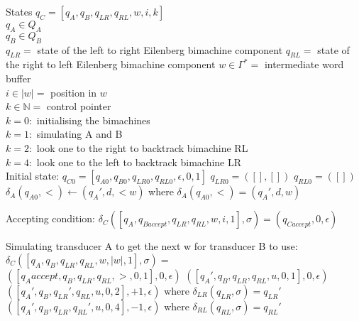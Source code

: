 \documentclass[12pt, a4paper]{article}
\begin{document}
\begin{algorithmic}
    \STATE States $q_C = [q_A, q_B, q_{LR}, q_{RL}, w, i, k]$\\
    \STATE $q_A \in Q_A$\\
    \STATE $q_B \in Q_B$\\
    \STATE $q_{LR} = $ state of the left to right Eilenberg bimachine component
    \STATE $q_{RL} = $ state of the right to left Eilenberg bimachine component
    \STATE $w \in \Gamma^* = $ intermediate word buffer\\
    \STATE $i \in |w| = $ position in $w$\\
    \STATE $k \in \mathbb{N} = $ control pointer\\
    \STATE $k = 0 : $ initialising the bimachines\\
    \STATE $k = 1 : $ simulating A and B\\
    \STATE $k = 2 : $ look one to the right to backtrack bimachine RL\\
    \STATE $k = 4 : $ look one to the left to backtrack bimachine LR\\


    \STATE Initial state: $q_{C0} = [q_{A0}, q_{B0}, q_{LR0}, q_{RL0}, \epsilon, 0, 1]$
    \STATE $q_{LR0} = ([], [])$
    \STATE $q_{RL0} = ([])$
    \STATE $\delta_A(q_{A0}, <) \gets (q_A', d, <w)$ where $\delta_A(q_{A0}, <) = (q_A', d, w)$

    

    \STATE Accepting condition:
    \STATE $\delta_C([q_A, q_{Baccept}, q_{LR}, q_{RL}, w, i, 1], \sigma) = (q_{Caccept}, 0, \epsilon)$


    \STATE Simulating transducer A to get the next w for transducer B to use:
    \STATE $\delta_C([q_A, q_B, q_{LR}, q_{RL}, w, |w|, 1], \sigma) = $\\
            \STATE $([q_Aaccept, q_B, q_{LR}, q_{RL}, >, 0, 1], 0, \epsilon)$
            \STATE $([q_A', q_B, q_{LR}, q_{RL}, u, 0, 1], 0, \epsilon)$
            \STATE $([q_A', q_B, q_{LR}', q_{RL}, u, 0, 2], +1, \epsilon)$ where $\delta_{LR}(q_{LR}, \sigma) = q_{LR}'$
            \STATE $([q_A', q_B, q_{LR}, q_{RL}', u, 0, 4], -1, \epsilon)$ where $\delta_{RL}(q_{RL}, \sigma) = q_{RL}'$
        \ENDIF
    

\end{algorithmic}
\end{document}
